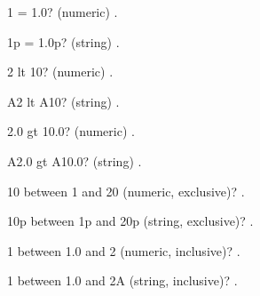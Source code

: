 \documentclass[12pt]{article}
\begin{document}
1 = 1.0? (numeric) . 

1p = 1.0p? (string) . 

2 lt 10? (numeric) . 

A2 lt A10? (string) . 

2.0 gt 10.0? (numeric) . 

A2.0 gt A10.0? (string) . 

10 between 1 and 20 (numeric, exclusive)?
. 

10p between 1p and 20p (string, exclusive)?
. 

1 between 1.0 and 2 (numeric, inclusive)?
. 

1 between 1.0 and 2A (string, inclusive)?
. 
\end{document}
